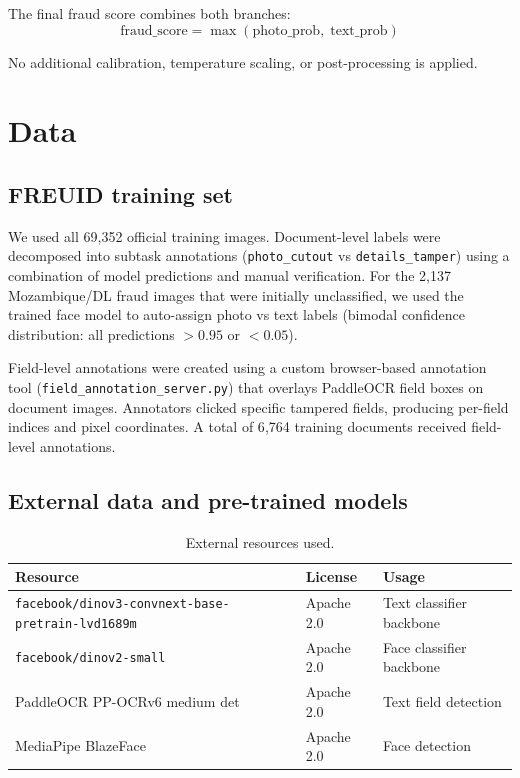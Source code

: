 \documentclass[11pt,a4paper]{article}
\begin{document}
The final fraud score combines both branches:
\[
  \text{fraud\_score} = \max(\text{photo\_prob},\; \text{text\_prob})
\]

No additional calibration, temperature scaling, or post-processing is applied.

\section{Data}
\label{sec:data}

\subsection{FREUID training set}

We used all 69{,}352 official training images.
Document-level labels were decomposed into subtask annotations
(\texttt{photo\_cutout} vs \texttt{details\_tamper}) using a combination of
model predictions and manual verification.
For the 2{,}137 Mozambique/DL fraud images that were initially unclassified,
we used the trained face model to auto-assign photo vs text labels (bimodal
confidence distribution: all predictions $>0.95$ or $<0.05$).

Field-level annotations were created using a custom browser-based annotation
tool (\texttt{field\_annotation\_server.py}) that overlays PaddleOCR field
boxes on document images. Annotators clicked specific tampered fields,
producing per-field indices and pixel coordinates.
A total of 6{,}764 training documents received field-level annotations.

\subsection{External data and pre-trained models}

\begin{table}[H]
  \centering
  \small
  \caption{External resources used.}
  \begin{tabular}{lll}
    \toprule
    Resource & License & Usage \\
    \midrule
    \texttt{facebook/dinov3-convnext-base-pretrain-lvd1689m} & Apache 2.0 & Text classifier backbone \\
    \texttt{facebook/dinov2-small} & Apache 2.0 & Face classifier backbone \\
    PaddleOCR PP-OCRv6 medium det & Apache 2.0 & Text field detection \\
    MediaPipe BlazeFace & Apache 2.0 & Face detection \\
    \bottomrule
  \end{tabular}
\end{table}
\end{document}
